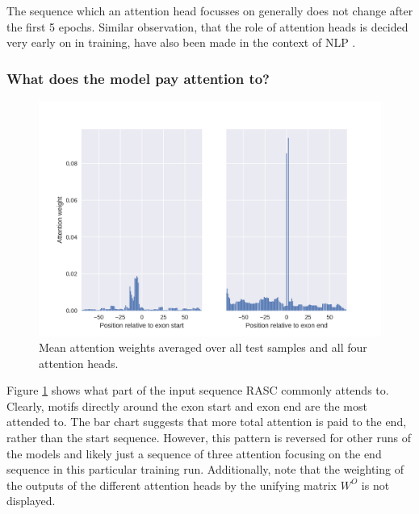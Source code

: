The sequence which an attention head focusses on generally does not change after the first 5 epochs. Similar observation, that the role of attention heads is decided very early on in training, have also been made in the context of NLP \cite{sixteenheads}.

\subsubsection{What does the model pay attention to?}

\begin{figure}
	\centering\includegraphics[width=1\textwidth]{../visualizations/ch5-results/mean_attention_barchart.png} 
	\caption{Mean attention weights averaged over all test samples and all four attention heads. }
	\label{fig:mean_attn}
\end{figure}

Figure \ref{fig:mean_attn} shows what part of the input sequence RASC commonly attends to. Clearly, motifs directly around the exon start and exon end are the most attended to. 
The bar chart suggests that more total attention is paid to the end, rather than the start sequence. However, this pattern is reversed for other runs of the models and likely just a sequence of three attention focusing on the end sequence in this particular training run. Additionally, note that the weighting of the outputs of the different attention heads by the unifying matrix $W^O$ is not displayed. 






